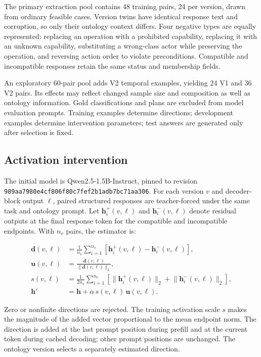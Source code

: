 \documentclass[preprint,12pt,numbers,nopreprintline]{elsarticle}
\begin{document}
The primary extraction pool contains 48 training pairs, 24 per version, drawn from ordinary feasible cases. Version twins have identical response text and corruption, so only their ontology context differs. Four negative types are equally represented: replacing an operation with a prohibited capability, replacing it with an unknown capability, substituting a wrong-class actor while preserving the operation, and reversing action order to violate preconditions. Compatible and incompatible responses retain the same status and membership fields.

An exploratory 60-pair pool adds V2 temporal examples, yielding 24 V1 and 36 V2 pairs. Its effects may reflect changed sample size and composition as well as ontology information. Gold classifications and plans are excluded from model evaluation prompts. Training examples determine directions; development examples determine intervention parameters; test answers are generated only after selection is fixed.

\subsection{Activation intervention}

The initial model is Qwen2.5-1.5B-Instruct, pinned to revision \nolinkurl{989aa7980e4cf806f80c7fef2b1adb7bc71aa306}. For each version $v$ and decoder-block output $\ell$, paired structured responses are teacher-forced under the same task and ontology prompt. Let $\mathbf{h}_i^{+}(v,\ell)$ and $\mathbf{h}_i^{-}(v,\ell)$ denote residual outputs at the final response token for the compatible and incompatible endpoints. With $n_v$ pairs, the estimator is:

\begin{align}
\mathbf{d}(v,\ell) &= \frac{1}{n_v}\sum_{i=1}^{n_v}
\left[\mathbf{h}_i^{+}(v,\ell)-\mathbf{h}_i^{-}(v,\ell)\right], \label{eq:direction}\\
\mathbf{u}(v,\ell) &= \frac{\mathbf{d}(v,\ell)}{\lVert\mathbf{d}(v,\ell)\rVert_2}, \label{eq:unit}\\
s(v,\ell) &= \frac{1}{2n_v}\sum_{i=1}^{n_v}
\left[\lVert\mathbf{h}_i^{+}(v,\ell)\rVert_2 + \lVert\mathbf{h}_i^{-}(v,\ell)\rVert_2\right], \label{eq:scale}\\
\mathbf{h}' &= \mathbf{h} + \alpha\,s(v,\ell)\,\mathbf{u}(v,\ell). \label{eq:intervention}
\end{align}

Zero or nonfinite directions are rejected. The training activation scale $s$ makes the magnitude of the added vector proportional to the mean endpoint norm. The direction is added at the last prompt position during prefill and at the current token during cached decoding; other prompt positions are unchanged. The ontology version selects a separately estimated direction.
\end{document}
